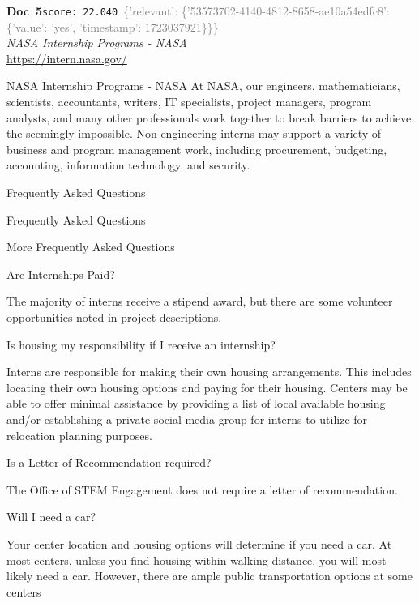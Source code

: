 \documentclass[a4paper,11pt]{article}
\begin{document}
\begin{docenv}
{\footnotesize\textcolor{doccolor}{\textbf{Doc~5}}}\hfill{\tiny\texttt{score:~22.040}}\ {\tiny\textcolor{gray}{\{'relevant': \{'53573702-4140-4812-8658-ae10a54edfc8': \{'value': 'yes', 'timestamp': 1723037921\}\}\}}}\\[3pt]
{\small\textit{NASA Internship Programs - NASA}}\\[2pt]
{\tiny\url{https://intern.nasa.gov/}}\\[4pt]
{\footnotesize NASA Internship Programs - NASA
At NASA, our engineers, mathematicians, scientists, accountants, writers, IT specialists, project managers, program analysts, and many other professionals work together to break barriers to achieve the seemingly impossible. Non-engineering interns may support a variety of business and program management work, including procurement, budgeting, accounting, information technology, and security.

Frequently Asked Questions

 

Frequently Asked Questions

	More Frequently Asked Questions 	

 

Are Internships Paid?

The majority of interns receive a stipend award, but there are some volunteer opportunities noted in project descriptions.

 

Is housing my responsibility if I receive an internship?

Interns are responsible for making their own housing arrangements. This includes locating their own housing options and paying for their housing. Centers may be able to offer minimal assistance by providing a list of local available housing and/or establishing a private social media group for interns to utilize for relocation planning purposes.

 

Is a Letter of Recommendation required?

The Office of STEM Engagement does not require a letter of recommendation. 

 

Will I need a car?

Your center location and housing options will determine if you need a car. At most centers, unless you find housing within walking distance, you will most likely need a car. However, there are ample public transportation options at some centers

}
\end{docenv}
\end{document}

